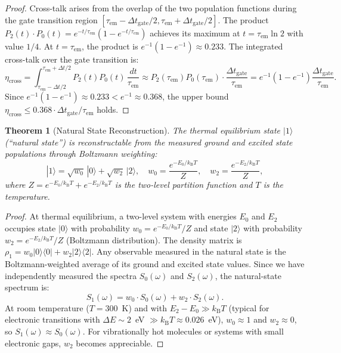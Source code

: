 \documentclass[11pt,a4paper]{article}
\newtheorem{theorem}{Theorem}[section]
\theoremstyle{definition}
\theoremstyle{remark}
\newcommand{\kB}{k_{\mathrm{B}}}
\begin{document}
\begin{proof}
Cross-talk arises from the overlap of the two population functions during the gate transition region $[\tau_{\mathrm{em}} - \Delta t_{\mathrm{gate}}/2, \tau_{\mathrm{em}} + \Delta t_{\mathrm{gate}}/2]$. The product $P_2(t) \cdot P_0(t) = e^{-t/\tau_{\mathrm{em}}}(1 - e^{-t/\tau_{\mathrm{em}}})$ achieves its maximum at $t = \tau_{\mathrm{em}} \ln 2$ with value $1/4$. At $t = \tau_{\mathrm{em}}$, the product is $e^{-1}(1 - e^{-1}) \approx 0.233$. The integrated cross-talk over the gate transition is:
\begin{equation}
\eta_{\mathrm{cross}} = \int_{\tau_{\mathrm{em}} - \Delta t/2}^{\tau_{\mathrm{em}} + \Delta t/2} P_2(t) P_0(t) \, \frac{dt}{\tau_{\mathrm{em}}} \approx P_2(\tau_{\mathrm{em}}) P_0(\tau_{\mathrm{em}}) \cdot \frac{\Delta t_{\mathrm{gate}}}{\tau_{\mathrm{em}}} = e^{-1}(1 - e^{-1}) \frac{\Delta t_{\mathrm{gate}}}{\tau_{\mathrm{em}}}.
\end{equation}
Since $e^{-1}(1-e^{-1}) \approx 0.233 < e^{-1} \approx 0.368$, the upper bound $\eta_{\mathrm{cross}} \leq 0.368 \cdot \Delta t_{\mathrm{gate}} / \tau_{\mathrm{em}}$ holds.
\end{proof}

\begin{theorem}[Natural State Reconstruction]
\label{thm:natural}
The thermal equilibrium state $|1\rangle$ (``natural state'') is reconstructable from the measured ground and excited state populations through Boltzmann weighting:
\begin{equation}
|1\rangle = \sqrt{w_0}\, |0\rangle + \sqrt{w_2}\, |2\rangle, \quad w_0 = \frac{e^{-E_0/\kB T}}{Z}, \quad w_2 = \frac{e^{-E_2/\kB T}}{Z},
\end{equation}
where $Z = e^{-E_0/\kB T} + e^{-E_2/\kB T}$ is the two-level partition function and $T$ is the temperature.
\end{theorem}

\begin{proof}
At thermal equilibrium, a two-level system with energies $E_0$ and $E_2$ occupies state $|0\rangle$ with probability $w_0 = e^{-E_0/\kB T}/Z$ and state $|2\rangle$ with probability $w_2 = e^{-E_2/\kB T}/Z$ (Boltzmann distribution). The density matrix is $\rho_1 = w_0 |0\rangle\langle 0| + w_2 |2\rangle\langle 2|$. Any observable measured in the natural state is the Boltzmann-weighted average of its ground and excited state values. Since we have independently measured the spectra $S_0(\omega)$ and $S_2(\omega)$, the natural-state spectrum is:
\begin{equation}
S_1(\omega) = w_0 \cdot S_0(\omega) + w_2 \cdot S_2(\omega).
\end{equation}
At room temperature ($T = 300$~K) and with $E_2 - E_0 \gg \kB T$ (typical for electronic transitions with $\Delta E \sim 2$~eV $\gg \kB T \approx 0.026$~eV), $w_0 \approx 1$ and $w_2 \approx 0$, so $S_1(\omega) \approx S_0(\omega)$. For vibrationally hot molecules or systems with small electronic gaps, $w_2$ becomes appreciable.
\end{proof}
\end{document}
